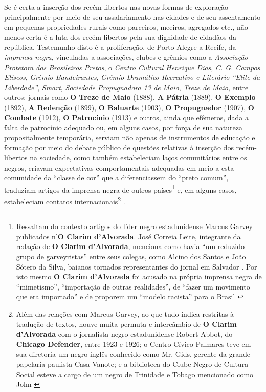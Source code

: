 Se é certa a inserção dos recém-libertos nas novas formas de exploração principalmente por meio de seu assalariamento nas cidades e de seu assentamento em pequenas propriedades rurais como parceiros, meeiros, agregados etc., não menos certa é a luta dos recém-libertos pela sua dignidade de cidadãos da república. Testemunho disto é a proliferação, de Porto Alegre a Recife, da \textit{imprensa negra}, vinculadas a associações, clubes e grêmios como a \textit{Associação Protetora dos Brasileiros Pretos}, o \textit{Centro Cultural Henrique Dias}, \textit{C. G. Campos Elíseos}, \textit{Grêmio Bandeirantes}, \textit{Grêmio Dramático Recreativo e Literário ``Elite da Liberdade''}, \textit{Smart}, \textit{Sociedade Propugnadora 13 de Maio}, \textit{Treze de Maio}, entre outros; jornais como \textbf{O Treze de Maio} (1888), \textbf{A Pátria} (1889), \textbf{O Exemplo} (1892), \textbf{A Redenção} (1899), \textbf{O Baluarte} (1903), \textbf{O Propugnador} (1907), \textbf{O Combate} (1912), \textbf{O Patrocínio} (1913) e outros, ainda que efêmeros, dada a falta de patrocínio adequado ou, em alguns casos, por força de sua natureza propositalmente temporária, serviam não apenas de instrumentos de educação e formação por meio do debate público de questões relativas à inserção dos recém-libertos na sociedade, como também estabeleciam laços comunitários entre os negros, criavam expectativas comportamentais adequadas em meio a esta comunidade da ``classe de cor'' que a diferenciassem do ``preto comum'', traduziam artigos da imprensa negra de outros países\footnote{Ressaltam do contexto artigos do líder negro estadunidense Marcus Garvey publicados n'\textbf{O Clarim d'Alvorada}. José Correia Leite, integrante da redação de \textbf{O Clarim d'Alvorada}, menciona como havia ``um reduzido grupo de garveyristas'' entre seus colegas, como Alcino dos Santos e João Sótero da Silva, baianos tornados representantes do jornal em Salvador \cite[p.~40]{gomes_negrosepolitica_2005}. Por isto mesmo \textbf{O Clarim d'Alvorada} foi acusado na própria imprensa negra de ``mimetismo'', ``importação de outras realidades'', de ``fazer um movimento que era importado'' e de proporem um ``modelo racista'' para o Brasil \cite[p.~42]{gomes_negrosepolitica_2005}} e, em alguns casos, estabeleciam contatos internacionais\footnote{Além das relações com Marcus Garvey, ao que tudo indica restritas à tradução de textos, houve muita permuta e intercâmbio de \textbf{O Clarim d'Alvorada} com o jornalista negro estadunidense Robert Abbot, do \textbf{Chicago Defender}, entre 1923 e 1926; o Centro Cívico Palmares teve em sua diretoria um negro inglês conhecido como Mr. Gids, gerente da grande papelaria paulista Casa Vanote; e a biblioteca do Clube Negro de Cultura Social esteve a cargo de um negro de Trinidade e Tobago mencionado como John \cite[pp.~43-44]{gomes_negrosepolitica_2005}} \cite[pp.~27-44]{gomes_negrosepolitica_2005}.

